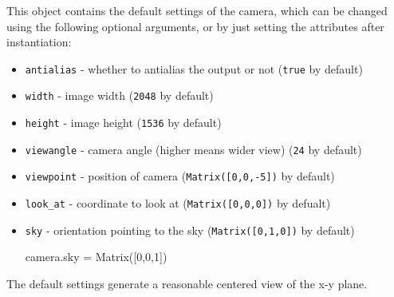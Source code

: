 This object contains the default settings of the camera, which can be
changed using the following optional arguments, or by just setting the
attributes after instantiation:

\begin{itemize}
\item
  \texttt{antialias} - whether to antialias the output or not
  (\texttt{true} by default)
\item
  \texttt{width} - image width (\texttt{2048} by default)
\item
  \texttt{height} - image height (\texttt{1536} by default)
\item
  \texttt{viewangle} - camera angle (higher means wider view)
  (\texttt{24} by default)
\item
  \texttt{viewpoint} - position of camera (\texttt{Matrix({[}0,0,-5{]})}
  by default)
\item
  \texttt{look\_at} - coordinate to look at
  (\texttt{Matrix({[}0,0,0{]})} by defualt)
\item
  \texttt{sky} - orientation pointing to the sky
  (\texttt{Matrix({[}0,1,0{]})} by default)

  camera.sky = Matrix({[}0,0,1{]})
\end{itemize}

The default settings generate a reasonable centered view of the x-y
plane.
